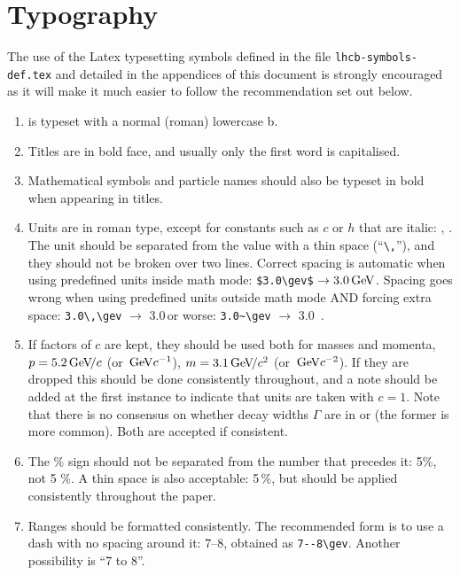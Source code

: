 \section{Typography}
\label{sec:typography}

The use of the Latex typesetting symbols defined in the file
\texttt{lhcb-symbols-def.tex} and detailed in the appendices of this
document is strongly encouraged as it will make it much easier to
follow the recommendation set out below.

\begin{enumerate}

\item \lhcb is typeset with a normal (roman) lowercase b.

\item Titles are in bold face, and usually only the first word is
  capitalised.

\item Mathematical symbols and particle names should also be typeset
  in bold when appearing in titles.

\item Units are in roman type, except for constants such as $c$ or $h$
  that are italic: \gev, \gevcc.  The unit should be separated from
  the value with a thin space (``\verb!\,!''),
  and they should not be broken over two lines.
  Correct spacing is automatic when using predefined units inside math mode: \verb!$3.0\gev$! $\rightarrow 3.0\text{\,Ge\kern -0.1em V}$.
  Spacing goes wrong when using predefined units outside math mode AND forcing extra space:
  \verb!3.0\,\gev! $\to$ 3.0\,\gev or worse:   \verb!3.0~\gev! $\to$ 3.0~\gev. 

\item  If factors of $c$ are kept, they should be used both for masses and
  momenta, \eg $p=5.2\text{\,Ge\kern -0.1em V\!/}c$ (or $\text{\,Ge\kern -0.1em V} c^{-1}$), $m = 3.1\text{\,Ge\kern -0.1em V\!/}c^2$ (or $\text{\,Ge\kern -0.1em V} c^{-2}$). If they are dropped this
  should be done consistently throughout, and a note should be added
  at the first instance to indicate that units are taken with $c=1$.
  Note that there is no consensus on whether decay widths $\Gamma$ are
  in \mev or \mevcc (the former is more common).
  Both are accepted if consistent. 

\item The \% sign should not be separated from the number that precedes it: 5\%, not 5 \%. 
A thin space is also acceptable: 5\,\%, but should be applied consistently throughout the paper.

\item Ranges should be formatted consistently. The recommended form is to use a dash with no spacing around it: 
7--8\gev, obtained as \verb!7--8\gev!. Another possibility is ``7 to 8\gev''.


\end{enumerate}
